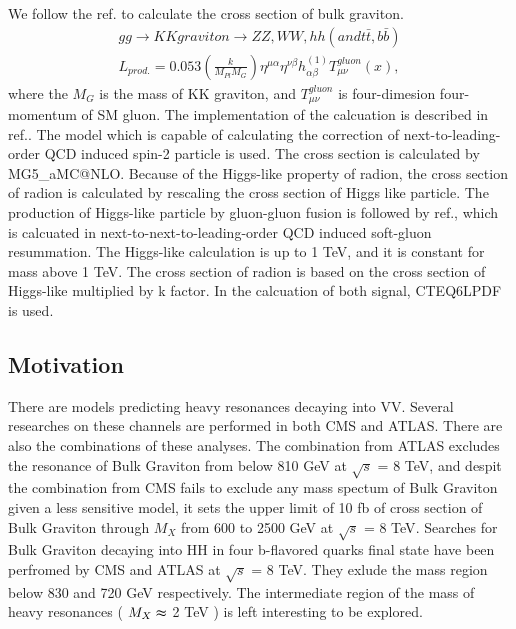We follow the ref.\citep{Agashe:2013kyb} to calculate the cross section of bulk graviton.
\begin{equation} \label{eq1}
\begin{split}
gg \rightarrow KK graviton \rightarrow ZZ, WW, hh (and t\bar{t}, b\bar{b}) \\
\textit{L}_{prod.} = 0.053 (\frac{k}{M_{Pl}M_{G}})\eta^{\mu\alpha}\eta^{\nu\beta}h^{(1)}_{\alpha\beta}T^{gluon}_{\mu \nu}(x), 
\end{split}
\end{equation}
where the $M_G$ is the mass of KK graviton, and $T^{gluon}_{\mu \nu}$ is four-dimesion four-momentum of SM gluon. The implementation of the calcuation is described in ref.\citep{Oliveira:2014kla}. The model which is capable of calculating the correction of next-to-leading-order QCD induced spin-2 particle is used. The cross section is calculated by \textsf{MG5\_aMC@NLO}.
Because of the Higgs-like property of radion, the cross section of radion is calculated by rescaling the cross section of Higgs like particle\citep{Agashe:2013kyb,AN-16-300}. The production of Higgs-like particle by gluon-gluon fusion is followed by ref.\citep{Catani:2003zt,Heinemeyer:2013tqa}, which is calcuated in next-to-next-to-leading-order QCD induced soft-gluon resummation. The Higgs-like calculation is up to 1 TeV, and it is constant for mass above 1 TeV. The cross section of radion is based on the cross section of Higgs-like multiplied by k factor. 
In the calcuation of both signal, CTEQ6LPDF is used\citep{Nadolsky:2008zw}.  

\subsection{Motivation} 
There are models predicting heavy resonances decaying into VV\citep{Brehmer:2015dan}.
Several researches on these channels are performed in both CMS and ATLAS.
There are also the combinations of these analyses\citep{Khachatryan:2014hpa,ATLASZV,ATLASWV,ATLASVV}.
The combination from ATLAS excludes the resonance of Bulk Graviton from below 810 GeV at $\sqrt{s}$ = 8 TeV\citep{Aad:2015ipg}, and despit the combination from CMS fails to exclude any mass spectum of Bulk Graviton given a less sensitive model, it sets the upper limit of 10 fb of cross section of Bulk Graviton through $M_X$ from 600 to 2500 GeV at $\sqrt{s}$ = 8 TeV\citep{CMSZVWV}.
Searches for Bulk Graviton decaying into HH in four b-flavored quarks final state have been perfromed by CMS and ATLAS at $\sqrt{s}$ = 8 TeV\citep{Khachatryan:2015year,Aad:2015uka}. They exlude the mass region below 830 and 720 GeV respectively. The intermediate region of the mass of heavy resonances ( $M_X \thickapprox$ 2 TeV ) is left interesting to be explored.
 



